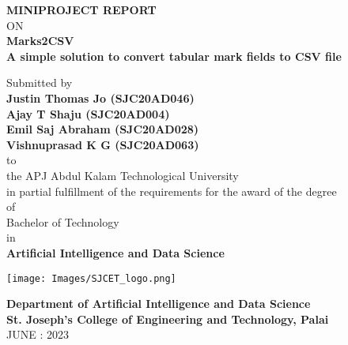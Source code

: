 



\newpage %

\thispagestyle{empty}
\begin{center}
 
{\normalsize \bf MINIPROJECT REPORT}\\
ON\\
\vspace*{0.2 cm}
{\huge \bf Marks2CSV}\\
{\normalsize \bf A simple solution to convert tabular mark fields to CSV file}

   \vspace{0.5 cm}
   \large Submitted by\\
   { \bf Justin Thomas Jo (SJC20AD046)}\\
   { \bf Ajay T Shaju (SJC20AD004)}\\
   { \bf Emil Saj Abraham (SJC20AD028)}\\
   { \bf Vishnuprasad K G (SJC20AD063)}\\[-0.6mm]
  {\large to\\[-0.6mm] the APJ Abdul Kalam Technological University\\[-0.6mm] in partial fulfillment of the requirements for the award of the degree\\[-0.6mm] of\\[-0.6mm] Bachelor of Technology\\[-0.6mm] in\\[-0.6mm] {\bf Artificial Intelligence and Data Science}}
  
   \begin{center}
   \texttt{[image: Images/SJCET\_logo.png]}
   \end{center}
   \vspace*{-0.5cm}
  {\LARGE {\bf Department of Artificial Intelligence and Data Science}}\\
          [-3mm] {\large {\bf St. Joseph's College of Engineering and Technology, Palai}\\
           [1mm] JUNE : 2023}

\end{center}


\newpage

